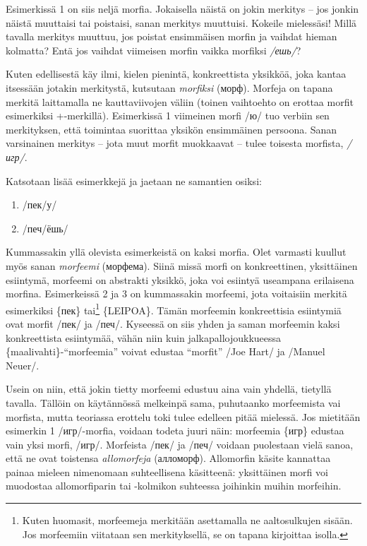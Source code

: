 \documentclass[]{scrartcl}
\providecommand{\tightlist}{%
  \setlength{\itemsep}{0pt}\setlength{\parskip}{0pt}}
\begin{document}
Esimerkissä 1 on siis neljä morfia. Jokaisella näistä on jokin merkitys
-- jos jonkin näistä muuttaisi tai poistaisi, sanan merkitys muuttuisi.
Kokeile mielessäsi! Millä tavalla merkitys muuttuu, jos poistat
ensimmäisen morfin ja vaihdat hieman kolmatta? Entä jos vaihdat
viimeisen morfin vaikka morfiksi \emph{/ешь/}?

Kuten edellisestä käy ilmi, kielen pienintä, konkreettista yksikköä,
joka kantaa itsessään jotakin merkitystä, kutsutaan \emph{morfiksi}
(морф). Morfeja on tapana merkitä laittamalla ne kauttaviivojen väliin
(toinen vaihtoehto on erottaa morfit esimerkiksi +-merkillä).
Esimerkissä 1 viimeinen morfi /ю/ tuo verbiin sen merkityksen, että
toimintaa suorittaa yksikön ensimmäinen persoona. Sanan varsinainen
merkitys -- jota muut morfit muokkaavat -- tulee toisesta morfista,
\emph{/игр/}.

Katsotaan lisää esimerkkejä ja jaetaan ne samantien osiksi:

\begin{enumerate}
\def\labelenumi{(\arabic{enumi})}
\setcounter{enumi}{1}
\tightlist
\item
  /пек/у/
\item
  /печ/ёшь/
\end{enumerate}

Kummassakin yllä olevista esimerkeistä on kaksi morfia. Olet varmasti
kuullut myös sanan \emph{morfeemi} (морфема). Siinä missä morfi on
konkreettinen, yksittäinen esiintymä, morfeemi on abstrakti yksikkö,
joka voi esiintyä useampana erilaisena morfina. Esimerkeissä 2 ja 3 on
kummassakin morfeemi, jota voitaisiin merkitä esimerkiksi \{пек\}
tai\footnote{Kuten huomasit, morfeemeja merkitään asettamalla ne
  aaltosulkujen sisään. Jos morfeemiin viitataan sen merkityksellä, se
  on tapana kirjoittaa isolla.} \{LEIPOA\}. Tämän morfeemin
konkreettisia esiintymiä ovat morfit /пек/ ja /печ/. Kyseessä on siis
yhden ja saman morfeemin kaksi konkreettista esiintymää, vähän niin kuin
jalkapallojoukkueessa \{maalivahti\}-``morfeemia'' voivat edustaa
``morfit'' /Joe Hart/ ja /Manuel Neuer/.

Usein on niin, että jokin tietty morfeemi edustuu aina vain yhdellä,
tietyllä tavalla. Tällöin on käytännössä melkeinpä sama, puhutaanko
morfeemista vai morfista, mutta teoriassa erottelu toki tulee edelleen
pitää mielessä. Jos mietitään esimerkin 1 /игр/-morfia, voidaan todeta
juuri näin: morfeemia \{игр\} edustaa vain yksi morfi, /игр/. Morfeista
/пек/ ja /печ/ voidaan puolestaan vielä sanoa, että ne ovat toistensa
\emph{allomorfeja} (алломорф). Allomorfin käsite kannattaa painaa
mieleen nimenomaan suhteellisena käsitteenä: yksittäinen morfi voi
muodostaa allomorfiparin tai -kolmikon suhteessa joihinkin muihin
morfeihin.
\end{document}
